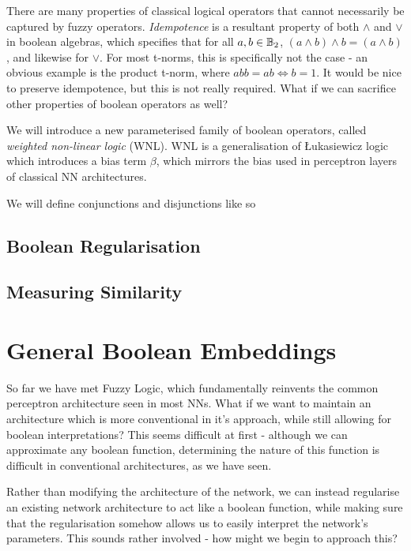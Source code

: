 \documentclass[conference]{report}
\begin{document}
There are many properties of classical logical operators that cannot necessarily be captured by fuzzy operators. \textit{Idempotence} is a resultant property of both $\land$ and $\lor$ in boolean algebras, which specifies that for all $a, b \in \mathbb{B}_2$, $(a \land b) \land b = (a \land b)$, and likewise for $\lor$. For most t-norms, this is specifically not the case - an obvious example is the product t-norm, where $abb=ab \iff b = 1$. It would be nice to preserve idempotence, but this is not really required. What if we can sacrifice other properties of boolean operators as well?

We will introduce a new parameterised family of boolean operators, called \textit{weighted non-linear logic} (WNL). WNL is a generalisation of Łukasiewicz logic which introduces a bias term $\beta$, which mirrors the bias used in perceptron layers of classical NN architectures. 

We will define conjunctions and disjunctions like so 



\subsection{Boolean Regularisation}

\subsection{Measuring Similarity}

\section{General Boolean Embeddings}

So far we have met Fuzzy Logic, which fundamentally reinvents the common perceptron architecture seen in most NNs. What if we want to maintain an architecture which is more conventional in it's approach, while still allowing for boolean interpretations? This seems difficult at first - although we can approximate any boolean function, determining the nature of this function is difficult in conventional architectures, as we have seen.

Rather than modifying the architecture of the network, we can instead regularise an existing network architecture to act like a boolean function, while making sure that the regularisation somehow allows us to easily interpret the network's parameters. This sounds rather involved - how might we begin to approach this?
\end{document}
